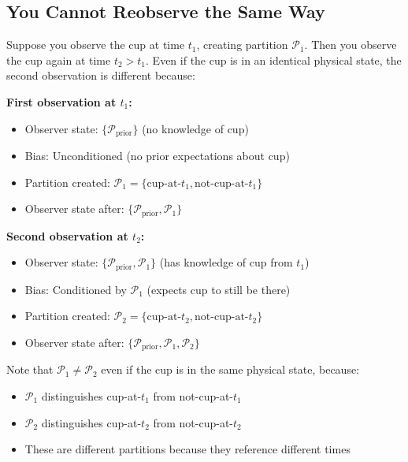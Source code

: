\documentclass[twocolumn,10pt]{article}
\theoremstyle{definition}
\theoremstyle{remark}
\begin{document}
\subsection{You Cannot Reobserve the Same Way}

Suppose you observe the cup at time $t_1$, creating partition $\mathcal{P}_1$. Then you observe the cup again at time $t_2 > t_1$. Even if the cup is in an identical physical state, the second observation is different because:

\vspace{0.2cm}
\noindent\textbf{First observation at $t_1$:}
\begin{itemize}
\item Observer state: $\{\mathcal{P}_{\text{prior}}\}$ (no knowledge of cup)
\item Bias: Unconditioned (no prior expectations about cup)
\item Partition created: $\mathcal{P}_1 = \{\text{cup-at-}t_1, \text{not-cup-at-}t_1\}$
\item Observer state after: $\{\mathcal{P}_{\text{prior}}, \mathcal{P}_1\}$
\end{itemize}

\vspace{0.2cm}
\noindent\textbf{Second observation at $t_2$:}
\begin{itemize}
\item Observer state: $\{\mathcal{P}_{\text{prior}}, \mathcal{P}_1\}$ (has knowledge of cup from $t_1$)
\item Bias: Conditioned by $\mathcal{P}_1$ (expects cup to still be there)
\item Partition created: $\mathcal{P}_2 = \{\text{cup-at-}t_2, \text{not-cup-at-}t_2\}$
\item Observer state after: $\{\mathcal{P}_{\text{prior}}, \mathcal{P}_1, \mathcal{P}_2\}$
\end{itemize}

\noindent Note that $\mathcal{P}_1 \neq \mathcal{P}_2$ even if the cup is in the same physical state, because:
\begin{itemize}
\item $\mathcal{P}_1$ distinguishes cup-at-$t_1$ from not-cup-at-$t_1$
\item $\mathcal{P}_2$ distinguishes cup-at-$t_2$ from not-cup-at-$t_2$
\item These are different partitions because they reference different times
\end{itemize}
\end{document}
